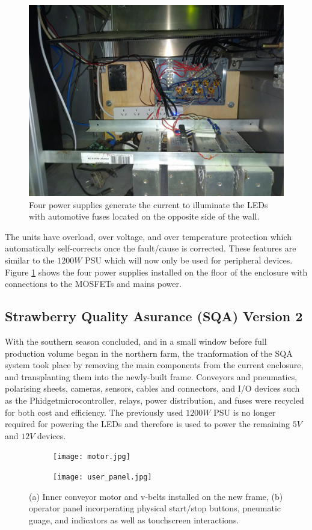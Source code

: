 \documentclass[fleqn,twoside]{article}
\begin{document}
\begin{figure}[h]
	\centering
	\includegraphics[width=.5\linewidth]{mosfet_power_supply.jpg}
	\caption{Four power supplies generate the current to illuminate the LEDs with automotive fuses located on the opposite side of the wall.}
	\label{fig:mosfet_power_supply}
\end{figure}%

The units have overload, over voltage, and over temperature protection which automatically self-corrects once the fault/cause is corrected. These features are similar to the $1200W$ PSU which will now only be used for peripheral devices. Figure \ref{fig:mosfet_power_supply} shows the four power supplies installed on the floor of the enclosure with connections to the MOSFETs and mains power.


\subsection{Strawberry Quality Asurance (SQA) Version 2}

With the southern season concluded, and in a small window before full production volume began in the northern farm, the tranformation of the SQA system took place by removing the main components from the current enclosure, and transplanting them into the newly-built frame. Conveyors and pneumatics, polarising sheets, cameras, sensors, cables and connectors, and I/O devices such as the Phidget\texttrademark microcontroller, relays, power distribution, and fuses were recycled for both cost and efficiency. The previously used $1200W$ PSU is no longer required for powering the LEDs and therefore is used to power the remaining $5V$ and $12V$ devices.


\begin{figure}[h]
	\centering
	\begin{subfigure}{0.5\textwidth}
		\centering
		\texttt{[image: motor.jpg]}
		\caption{}
		\label{fig:motor}
	\end{subfigure}%
	\begin{subfigure}{0.5\textwidth}
		\centering
		\texttt{[image: user\_panel.jpg]}
		\caption{}
		\label{fig:user_panel}
	\end{subfigure}%
	\caption{(a) Inner conveyor motor and v-belts installed on the new frame, (b) operator panel incorperating physical start/stop buttons, pneumatic guage, and indicators as well as touchscreen interactions.}
	\label{}
\end{figure}
\end{document}
